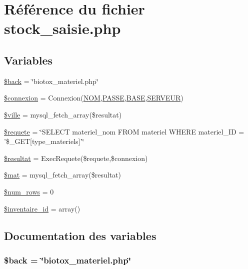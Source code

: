 \hypertarget{stock__saisie_8php}{
\section{R\'{e}f\'{e}rence du fichier stock\_\-saisie.php}
\label{stock__saisie_8php}
}
\subsection*{Variables}
\begin{CompactItemize}
\item 
\hyperlink{stock__saisie_8php_a0}{\$back} = \char`\"{}biotox\_\-materiel.php\char`\"{}
\item 
\hyperlink{stock__saisie_8php_a1}{\$connexion} = Connexion(\hyperlink{pma__connect_8php_a0}{NOM},\hyperlink{pma__connect_8php_a1}{PASSE},\hyperlink{pma__connect_8php_a3}{BASE},\hyperlink{pma__connect_8php_a2}{SERVEUR})
\item 
\hyperlink{stock__saisie_8php_a2}{\$ville} = mysql\_\-fetch\_\-array(\$resultat)
\item 
\hyperlink{stock__saisie_8php_a3}{\$requete} = \char`\"{}SELECT materiel\_\-nom FROM materiel WHERE materiel\_\-ID = '\$\_\-GET\mbox{[}type\_\-materiels\mbox{]}'\char`\"{}
\item 
\hyperlink{stock__saisie_8php_a4}{\$resultat} = Exec\-Requete(\$requete,\$connexion)
\item 
\hyperlink{stock__saisie_8php_a5}{\$mat} = mysql\_\-fetch\_\-array(\$resultat)
\item 
\hyperlink{stock__saisie_8php_a6}{\$num\_\-rows} = 0
\item 
\hyperlink{stock__saisie_8php_a7}{\$inventaire\_\-id} = array()
\end{CompactItemize}


\subsection{Documentation des variables}
\hypertarget{stock__saisie_8php_a0}{
\subsubsection[\$back]{\setlength{\rightskip}{0pt plus 5cm}\$back = \char`\"{}biotox\_\-materiel.php\char`\"{}}}
\label{stock__saisie_8php_a0}


